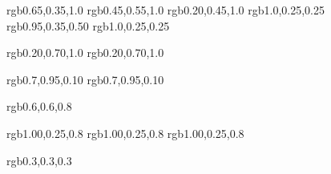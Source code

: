 \definecolor{jb1}            {rgb}{0.65,0.35,1.0}   %
\definecolor{jbn}            {rgb}{0.45,0.55,1.0}   %
\definecolor{jbnn}           {rgb}{0.20,0.45,1.0}   %
%
\definecolor{gg}             {rgb}{1.0,0.25,0.25}     %
%
\definecolor{gs}             {rgb}{0.95,0.35,0.50}   %
\definecolor{jm}             {rgb}{1.0,0.25,0.25}   %


\definecolor{todoblue}       {rgb}{0.20,0.70,1.0}  %
\definecolor{bluetodo}       {rgb}{0.20,0.70,1.0}  %

\definecolor{organizational} {rgb}{0.7,0.95,0.10}   %
\definecolor{org}            {rgb}{0.7,0.95,0.10}   %

\definecolor{done}           {rgb}{0.6,0.6,0.8}    %

\definecolor{cleanup}        {rgb}{1.00,0.25,0.8}
\definecolor{clean}          {rgb}{1.00,0.25,0.8}
\definecolor{tag}            {rgb}{1.00,0.25,0.8}

\definecolor{moved}          {rgb}{0.3,0.3,0.3}

